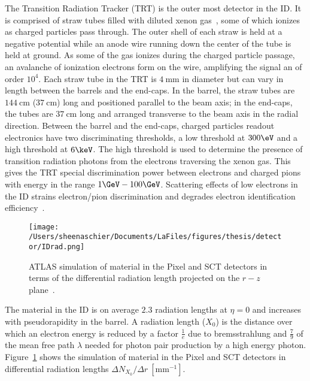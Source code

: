 The Transition Radiation Tracker (TRT) is the outer most detector in the ID.  It is comprised of straw tubes filled with diluted xenon gas~\cite{Mitsou:2003rp}, some of which ionizes as charged particles pass through.   The outer shell of each straw is held at a negative potential while an anode wire running down the center of the tube is held at ground.  As some of the gas ionizes during the charged particle passage, an avalanche of ionization electrons form on the wire, amplifying the signal an of order $10^4$. Each straw tube in the TRT is $4~\mathrm{mm}$ in diameter but can vary in length between the barrels and the end-caps.  In the barrel, the straw tubes are $144~\mathrm{cm}$ ($37~\mathrm{cm}$) long and positioned parallel to the beam axis; in the end-caps, the tubes are $37~\mathrm{cm}$ long and arranged transverse to the beam axis in the radial direction.  %
Between the barrel and the end-caps, charged particles readout electronics have two discriminating thresholds, a low threshold at $300\eV$ and a high threshold at $6\keV$.  The high threshold is used to determine the presence of transition radiation photons from the electrons traversing the xenon gas.  This gives the TRT special discrimination power between electrons and charged pions with energy in the range $1\GeV - 100\GeV$.  Scattering effects of low \pt electrons in the ID strains electron/pion discrimination and degrades electron identification efficiency~\cite{MINDUR2017257}.  

  \begin{figure}[tbp]
  \centering
 \texttt{[image: /Users/sheenaschier/Documents/LaFiles/figures/thesis/detector/IDrad.png]}
    \caption{ATLAS simulation of material in the Pixel and SCT detectors in terms of the differential radiation length projected on the $r-z$ plane~\cite{Aaboud:2017pjd}.}
   \label{fig:IDmat}
 \end{figure}
 The material in the ID is on average $2.3$ radiation lengths at $\eta=0$ and increases with pseudorapidity in the barrel.  A radiation length ($X_0$) is the distance over which an electron energy is reduced by a factor $\frac{1}{e}$ due to bremsstrahlung and $\frac{7}{9}$ of the mean free path $\lambda$ needed for photon pair production by a high energy photon.  Figure~\ref{fig:IDmat} shows the simulation of material in the Pixel and SCT detectors in differential radiation lengths $\Delta N_{X_0}/\Delta r~[\mathrm{mm}^{-1}]$.
\FloatBarrier

